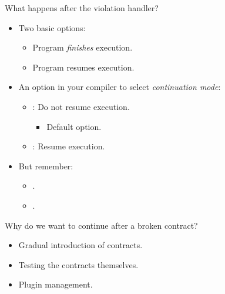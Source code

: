 \begin{frame}[t]{What happens after the violation handler?}
\begin{itemize}
  \item Two basic options:
    \begin{itemize}
      \item Program \emph{finishes} execution.
      \item Program resumes execution.
    \end{itemize}

  \vfill\pause
  \item An option in your compiler to select \emph{continuation mode}:
    \begin{itemize}
      \item {}: Do not resume execution.
        \begin{itemize}
          \item Default option.
        \end{itemize}
      \item {}: Resume execution.
    \end{itemize}

  \vfill\pause
  \item But remember:
    \pause
    \begin{itemize}[<+->]
      \item {}.
      \item {}.
    \end{itemize}
\end{itemize}
\end{frame}

\begin{frame}[t]{Why do we want to continue after a broken contract?}
\begin{itemize}
  \item Gradual introduction of contracts.

  \vfill\pause
  \item Testing the contracts themselves.

  \vfill\pause
  \item Plugin management.
\end{itemize}
\end{frame}

